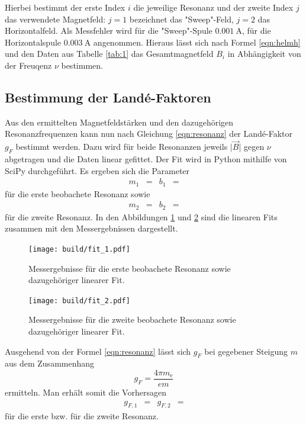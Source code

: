 Hierbei bestimmt der erste Index $i$ die jeweilige Resonanz und der zweite Index $j$ das verwendete Magnetfeld: $j=1$ bezeichnet das "Sweep"-Feld, $j=2$ das Horizontalfeld.
Als Messfehler wird für die "Sweep"-Spule $\SI{0.001}{\ampere}$, für die Horizontalspule $\SI{0.003}{\ampere}$ angenommen.
Hieraus lässt sich nach Formel \eqref{eqn:helmh} und den Daten aus Tabelle \ref{tab:1} das Gesamtmagnetfeld $B_i$ in Abhängigkeit von der Freuqenz $\nu$ bestimmen.

\subsection{Bestimmung der Land\'{e}-Faktoren}
Aus den ermittelten Magnetfeldstärken und den dazugehörigen Resonanzfrequenzen kann nun nach Gleichung \ref{eqn:resonanz} der Land\'{e}-Faktor $g_F$ bestimmt werden.
Dazu wird für beide Resonanzen jeweils $\lvert \vec{B} \rvert$ gegen $\nu$ abgetragen und die Daten linear gefittet.
Der Fit wird in Python mithilfe von SciPy durchgeführt.
Es ergeben sich die Parameter
\begin{align*}
  m_1 &=  & b_1 &= 
\end{align*}
für die erste beobachete Resonanz sowie
\begin{align*}
  m_2 &=  & b_2 &= 
\end{align*}
für die zweite Resonanz.
In den Abbildungen \ref{plot:1} und \ref{plot:2} sind die linearen Fits zusammen mit den Messergebnissen dargestellt.
\begin{figure}
  \centering
  \texttt{[image: build/fit\_1.pdf]}
  \caption{Messergebnisse für die erste beobachete Resonanz sowie dazugehöriger linearer Fit.}
  \label{plot:1}
\end{figure}

\begin{figure}
  \centering
  \texttt{[image: build/fit\_2.pdf]}
  \caption{Messergebnisse für die zweite beobachete Resonanz sowie dazugehöriger linearer Fit.}
  \label{plot:2}
\end{figure}

Ausgehend von der Formel \ref{eqn:resonanz} lässt sich $g_F$ bei gegebener Steigung $m$ aus dem Zusammenhang
\begin{equation}
  g_F = \frac{4 \pi m_\text{e}}{e m}
\end{equation}
ermitteln.
Man erhält somit die Vorhersagen
\begin{align*}
  g_{F,1} &=  & g_{F,2} &= 
\end{align*}
für die erste bzw. für die zweite Resonanz.

